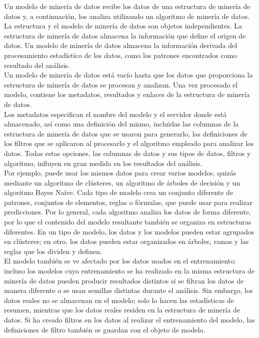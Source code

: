 \documentclass[a4paper, 11pt]{article} %
\begin{document}
Un modelo de minería de datos recibe los datos de una estructura de minería de datos y, a continuación, los analiza utilizando un algoritmo de minería de datos. La estructura y el modelo de minería de datos son objetos independientes. La estructura de minería de datos almacena la información que define el origen de datos. Un modelo de minería de datos almacena la información derivada del procesamiento estadístico de los datos, como los patrones encontrados como resultado del análisis.\\

Un modelo de minería de datos está vacío hasta que los datos que proporciona la estructura de minería de datos se procesan y analizan. Una vez procesado el modelo, contiene los metadatos, resultados y enlaces de la estructura de minería de datos.\\

Los metadatos especifican el nombre del modelo y el servidor donde está almacenado, así como una definición del mismo, incluidas las columnas de la estructura de minería de datos que se usaron para generarlo, las definiciones de los filtros que se aplicaron al procesarlo y el algoritmo empleado para analizar los datos. Todas estas opciones, las columnas de datos y sus tipos de datos, filtros y algoritmo, influyen en gran medida en los resultados del análisis.\\

Por ejemplo, puede usar los mismos datos para crear varios modelos, quizás mediante un algoritmo de clústeres, un algoritmo de árboles de decisión y un algoritmo Bayes Naïve. Cada tipo de modelo crea un conjunto diferente de patrones, conjuntos de elementos, reglas o fórmulas, que puede usar para realizar predicciones. Por lo general, cada algoritmo analiza los datos de forma diferente, por lo que el contenido del modelo resultante también se organiza en estructuras diferentes. En un tipo de modelo, los datos y los modelos pueden estar agrupados en clústeres; en otro, los datos pueden estar organizados en árboles, ramas y las reglas que los dividen y definen.\\

El modelo también se ve afectado por los datos usados en el entrenamiento: incluso los modelos cuyo entrenamiento se ha realizado en la misma estructura de minería de datos pueden producir resultados distintos si se filtran los datos de manera diferente o se usan semillas distintas durante el análisis. Sin embargo, los datos reales no se almacenan en el modelo; solo lo hacen las estadísticas de resumen, mientras que los datos reales residen en la estructura de minería de datos. Si ha creado filtros en los datos al realizar el entrenamiento del modelo, las definiciones de filtro también se guardan con el objeto de modelo.\\
\end{document}
